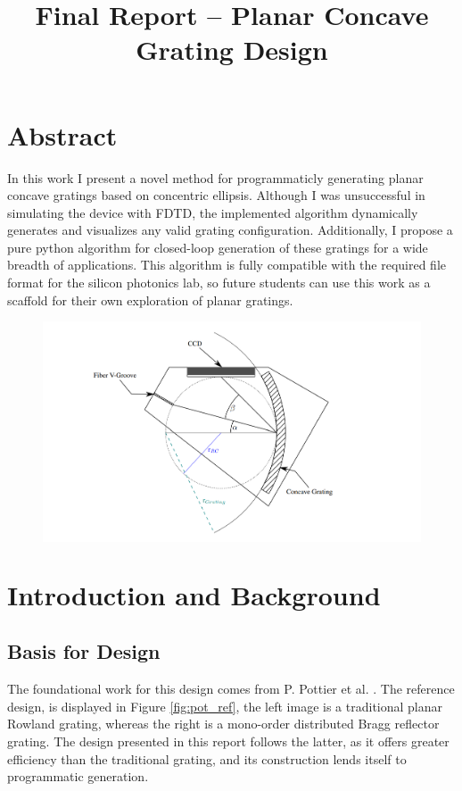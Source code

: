 \documentclass{article}
\title{Final Report -- Planar Concave Grating Design}
\begin{document}
\maketitle

\thispagestyle{empty}
\tableofcontents
\newpage
\setcounter{page}{1}

\section{Abstract}
In this work I present a novel method for programmaticly generating planar concave gratings based on concentric ellipsis. Although I was unsuccessful in simulating the device with FDTD, the implemented algorithm dynamically generates and visualizes any valid grating configuration. Additionally, I propose a pure python algorithm for closed-loop generation of these gratings for a wide breadth of applications. This algorithm is fully compatible with the required file format for the silicon photonics lab, so future students can use this work as a scaffold for their own exploration of planar gratings.

\begin{figure}[H]
\centering
\large 
\def\svgwidth{0.8 \textwidth}
\colorbox{white}{\includegraphics{images/grating_diagram_dd.png}}
\end{figure}

\newpage

\section{Introduction and Background}

\subsection{Basis for Design}
The foundational work for this design comes from P. Pottier et al. \cite{Packirisamy2012Mono-OrderGrating}. The reference design, is displayed in Figure \ref{fig:pot_ref}, the left image is a traditional planar Rowland grating, whereas the right is a mono-order distributed Bragg reflector grating. The design presented in this report follows the latter, as it offers greater efficiency than the traditional grating, and its construction lends itself to programmatic generation. 
\end{document}
